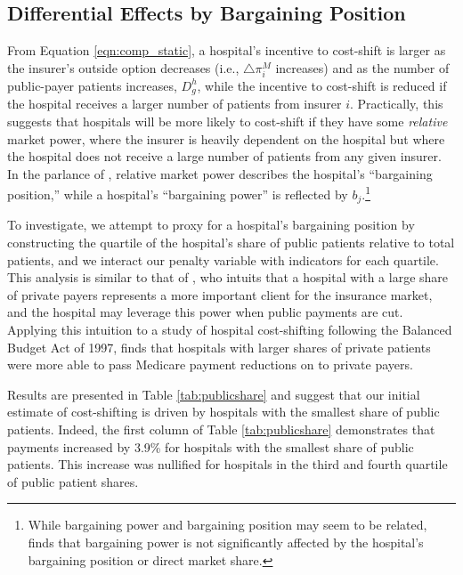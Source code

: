 \documentclass[12pt]{article}
\begin{document}
\subsection{Differential Effects by Bargaining Position}
From Equation \ref{eqn:comp_static}, a hospital's incentive to cost-shift is larger as the insurer's outside option decreases (i.e., $\triangle \pi_{i}^{M}$ increases) and as the number of public-payer patients increases, $D_{g}^{h}$, while the incentive to cost-shift is reduced if the hospital receives a larger number of patients from insurer $i$. Practically, this suggests that hospitals will be more likely to cost-shift if they have some \textit{relative} market power, where the insurer is heavily dependent on the hospital but where the hospital does not receive a large number of patients from any given insurer. In the parlance of \cite{lewis2015}, relative market power describes the hospital's ``bargaining position,'' while a hospital's ``bargaining power'' is reflected by $b_{j}$.\footnote{While bargaining power and bargaining position may seem to be related, \cite{lewis2015} finds that bargaining power is not significantly affected by the hospital's bargaining position or direct market share.}

To investigate, we attempt to proxy for a hospital's bargaining position by constructing the quartile of the hospital's share of public patients relative to total patients, and we interact our penalty variable with indicators for each quartile. This analysis is similar to that of \cite{wu2010}, who intuits that a hospital with a large share of private payers represents a more important client for the insurance market, and the hospital may leverage this power when public payments are cut. Applying this intuition to a study of hospital cost-shifting following the Balanced Budget Act of 1997, \cite{wu2010} finds that hospitals with larger shares of private patients were more able to pass Medicare payment reductions on to private payers.

Results are presented in Table \ref{tab:publicshare} and suggest that our initial estimate of cost-shifting is driven by hospitals with the smallest share of public patients. Indeed, the first column of Table \ref{tab:publicshare} demonstrates that payments increased by 3.9\% for hospitals with the smallest share of public patients. This increase was nullified for hospitals in the third and fourth quartile of public patient shares.
\end{document}
